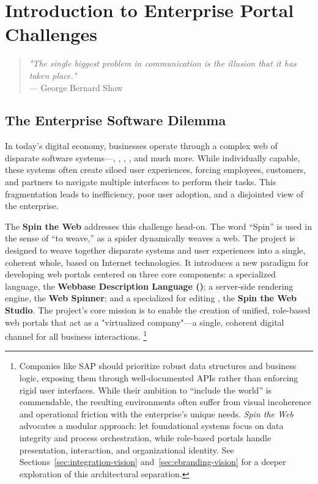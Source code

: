 
\chapter{Introduction to Enterprise Portal Challenges}
\label{chap:intro}

\begin{quote}
\textit{"The single biggest problem in communication is the illusion that it has taken place."} \\
— George Bernard Shaw
\end{quote}

\section{The Enterprise Software Dilemma}
\label{sec:enterprise-dilemma}

In today's digital economy, businesses operate through a complex web of disparate software systems—, , , , and much more. While individually capable, these systems often create siloed user experiences, forcing employees, customers, and partners to navigate multiple interfaces to perform their tasks. This fragmentation leads to inefficiency, poor user adoption, and a disjointed view of the enterprise.

The \textbf{Spin the Web} addresses this challenge head-on. The word ``Spin'' is used in the sense of ``to weave,'' as a spider dynamically weaves a web. The project is designed to weave together disparate systems and user experiences into a single, coherent whole, based on Internet technologies. It introduces a new paradigm for developing web portals centered on three core components: a specialized language, the \textbf{Webbase Description Language (\wbdl{})}; a server-side rendering engine, the \textbf{Web Spinner}; and a specialized \webbaselet{} for editing , the \textbf{Spin the Web Studio}. The project's core mission is to enable the creation of unified, role-based web portals that act as a "virtualized company"—a single, coherent digital channel for all business interactions.
\footnote{Companies like SAP should prioritize robust data structures and business logic, exposing them through well-documented APIs rather than enforcing rigid user interfaces. While their ambition to “include the world” is commendable, the resulting environments often suffer from visual incoherence and operational friction with the enterprise's unique needs. \textit{Spin the Web} advocates a modular approach: let foundational systems focus on data integrity and process orchestration, while role-based portals handle presentation, interaction, and organizational identity. See Sections~\ref{sec:integration-vision} and~\ref{sec:ebranding-vision} for a deeper exploration of this architectural separation.}

